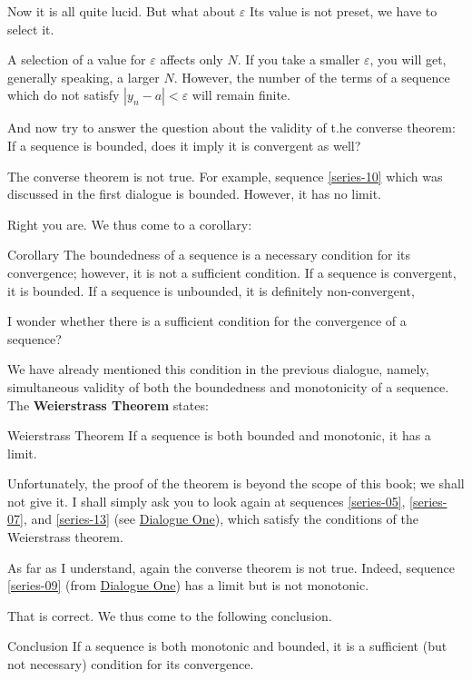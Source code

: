 {\rdr Now it is all quite lucid. But what about $\varepsilon$ Its value is not preset, we have to select it.

\athr A selection of a value for $\varepsilon$ affects only $N$. If you	take a smaller $\varepsilon$,	you will get, generally speaking, a larger $N$. However, the number of the terms of a sequence which do not satisfy	$| y_{n} - a | < \varepsilon$ will remain finite.

And now try to answer the question about the validity of t.he converse theorem: If a sequence is bounded, does it imply it is convergent as well?

\rdr The converse theorem is not true. For example, sequence \eqref{series-10} which was discussed in the first dialogue is bounded. However, it has no limit.

\athr Right you are. We thus come to a corollary:
\begin{mytheo}{Corollary}
The boundedness of a sequence is a necessary condition for its convergence; however, it is not a sufficient condition. If a sequence is convergent, it is bounded. If a sequence is unbounded, it is definitely non-convergent,
\end{mytheo}

\rdr I wonder whether there is a sufficient condition for the convergence of a sequence?

\athr We have already mentioned this condition in the previous dialogue, namely, simultaneous validity of both the boundedness and monotonicity of a sequence. The \textbf{Weierstrass Theorem} states:
\begin{mytheo}{Weierstrass Theorem}
If a sequence is both bounded and monotonic, it has a limit.
\end{mytheo}
Unfortunately, the proof of the theorem is beyond the scope of this book; we shall not give it. I shall simply ask you to look again at sequences \eqref{series-05}, \eqref{series-07}, and \eqref{series-13} (see \hyperref[infinite-seq]{Dialogue One}), which satisfy the conditions of the Weierstrass theorem. 

\rdr As far as I understand, again the converse theorem is not true. Indeed, sequence \eqref{series-09} (from \hyperref[infinite-seq]{Dialogue One}) has a
limit but is not monotonic. 

\athr That is correct. We thus come to the following conclusion.
\begin{mytheo}{Conclusion}
If a sequence is both monotonic and bounded, it is a sufficient (but not necessary)	condition for its convergence.
\end{mytheo}

}
